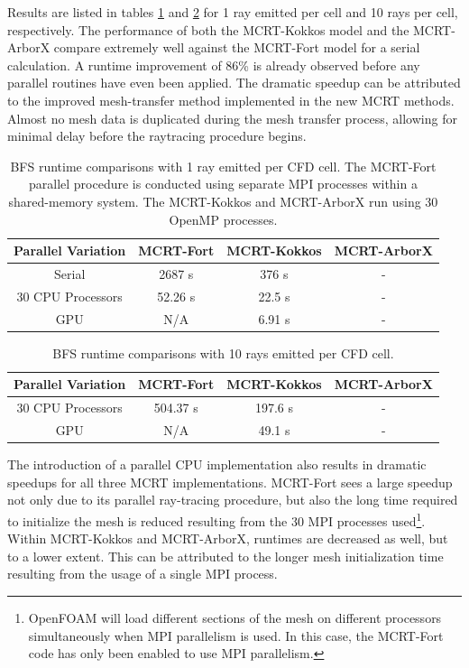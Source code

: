 Results are listed in tables \ref{table:BFS_runtime_table_1rpc} and \ref{table:BFS_runtime_table_10rpc} for 1 ray emitted per cell and 10 rays per cell, respectively. The performance of both the MCRT-Kokkos model and the MCRT-ArborX compare extremely well against the MCRT-Fort model for a serial calculation. A runtime improvement of 86\% is already observed before any parallel routines have even been applied.
The dramatic speedup can be attributed to the improved mesh-transfer method implemented in the new MCRT methods. 
Almost no mesh data is duplicated during the mesh transfer process, allowing for minimal delay before the raytracing procedure begins.

\begin{table}[h!]
\centering
\begin{tabular}{||c c c c||} 
 \hline
 Parallel Variation & MCRT-Fort & MCRT-Kokkos & MCRT-ArborX \\ [0.5ex] 
 \hline\hline
 Serial & 2687 s & 376 s & - \\ 
 30 CPU Processors & 52.26 s & 22.5 s & - \\
 GPU & N/A & 6.91 s & - \\
 \hline
\end{tabular}
\caption{BFS runtime comparisons with 1 ray emitted per CFD cell. The MCRT-Fort parallel procedure is conducted using separate MPI processes within a shared-memory system. The MCRT-Kokkos and MCRT-ArborX run using 30 OpenMP processes.}
\label{table:BFS_runtime_table_1rpc}
\end{table}

\begin{table}[h!]
\centering
\begin{tabular}{||c c c c||} 
 \hline
 Parallel Variation & MCRT-Fort & MCRT-Kokkos & MCRT-ArborX \\ [0.5ex] 
 \hline\hline
 30 CPU Processors & 504.37 s & 197.6 s & - \\
 GPU & N/A & 49.1 s & - \\
 \hline
\end{tabular}
\caption{BFS runtime comparisons with 10 rays emitted per CFD cell.}
\label{table:BFS_runtime_table_10rpc}
\end{table}


The introduction of a parallel CPU implementation also results in dramatic speedups for all three MCRT implementations. MCRT-Fort sees a large speedup not only due to its parallel ray-tracing procedure, but also the long time required to initialize the mesh is reduced resulting from the 30 MPI processes used\footnote{OpenFOAM will load different sections of the mesh on different processors simultaneously when MPI parallelism is used. In this case, the MCRT-Fort code has only been enabled to use MPI parallelism.}.
Within MCRT-Kokkos and MCRT-ArborX, runtimes are decreased as well, but to a lower extent. This can be attributed to the longer mesh initialization time resulting from the usage of a single MPI process.

